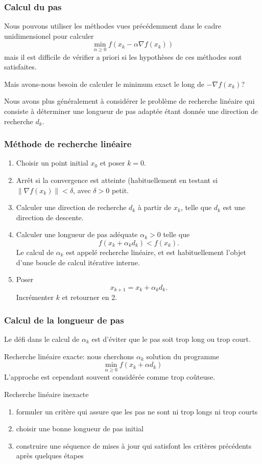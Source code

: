 \documentclass[usepdftitle=false]{beamer}
\def\red{\color{red}}
\begin{document}
\begin{frame}
\frametitle{Calcul du pas}

Nous pouvons utiliser les méthodes vues précédemment dans le cadre unidimensionel pour calculer
$$
\min_{\alpha \geq 0} f(x_k-\alpha \nabla f(x_k))
$$
mais il est difficile de vérifier a priori si les hypothèses de ces méthodes sont satisfaites.

\mbox{}

Mais avons-nous besoin de calculer le minimum exact le long de $-\nabla f(x_k)$?

\mbox{}

Nous avons plus généralement à considérer le problème de recherche linéaire qui consiste à déterminer une longueur de pas adaptée étant donnée une direction de recherche $d_k$.

\end{frame}

\begin{frame}
\frametitle{Méthode de recherche linéaire}

\begin{enumerate}
\item
Choisir un point initial $x_0$ et poser $k = 0$.
\item
Arrêt si la convergence est atteinte (habituellement en testant si $\| \nabla f(x_k) \| < \delta$, avec $\delta > 0$ petit.
\item
Calculer une direction de recherche $d_k$ à partir de $x_k$, telle que $d_k$ est une direction de descente.
\item
Calculer une longueur de pas adéquate $\alpha_k > 0$ telle que
$$
f(x_k + \alpha_k d_k) < f(x_k).
$$
Le calcul de $\alpha_k$ est appelé recherche linéaire, et est habituellement l'objet d'une boucle de calcul itérative interne.
\item
Poser
$$
x_{k+1} = x_k + \alpha_k d_k.
$$
Incrémenter $k$ et retourner en 2.
\end{enumerate}

\end{frame}

\begin{frame}
\frametitle{Calcul de la longueur de pas}

Le défi dans le calcul de $\alpha_k$ est d'éviter que le pas soit trop long ou trop court.

\mbox{}

{\red Recherche linéaire exacte}: nous cherchons $\alpha_k$ solution du programme
$$
\min_{\alpha \geq 0} f(x_k + \alpha d_k)
$$
L'approche est cependant souvent considérée comme trop coûteuse.

\mbox{}

{\red Recherche linéaire inexacte}
\begin{enumerate}
	\item
	formuler un critère qui assure que les pas ne sont ni trop longs ni trop courts
	\item
	choisir une bonne longueur de pas initial
	\item
	construire une séquence de mises à jour qui satisfont les critères précédents après quelques étapes
\end{enumerate}

\end{frame}
\end{document}
